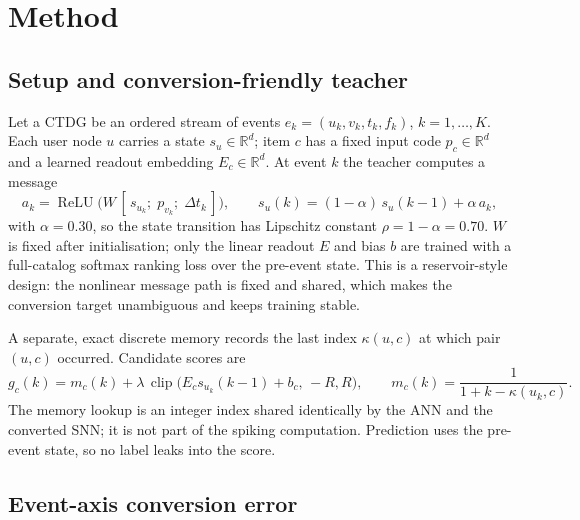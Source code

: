 \documentclass[preprint,12pt]{elsarticle}
\begin{document}
\section{Method}
\label{sec:method}

\subsection{Setup and conversion-friendly teacher}

Let a CTDG be an ordered stream of events $e_k=(u_k,v_k,t_k,f_k)$, $k=1,\dots,K$. Each user node $u$ carries a state $s_u\in\mathbb{R}^{d}$; item $c$ has a fixed input code $p_c\in\mathbb{R}^{d}$ and a learned readout embedding $E_c\in\mathbb{R}^{d}$. At event $k$ the teacher computes a message
\begin{equation}
a_k = \operatorname{ReLU}\!\big(W\,[\,s_{u_k};\;p_{v_k};\;\Delta t_k\,]\big),\qquad
s_u(k) = (1-\alpha)\,s_u(k-1) + \alpha\,a_k ,
\label{eq:message}
\end{equation}
with $\alpha=0.30$, so the state transition has Lipschitz constant $\rho=1-\alpha=0.70$. $W$ is fixed after initialisation; only the linear readout $E$ and bias $b$ are trained with a full-catalog softmax ranking loss over the pre-event state. This is a reservoir-style design: the nonlinear message path is fixed and shared, which makes the conversion target unambiguous and keeps training stable.

A separate, exact discrete memory records the last index $\kappa(u,c)$ at which pair $(u,c)$ occurred. Candidate scores are
\begin{equation}
g_c(k) = m_c(k) + \lambda\,\operatorname{clip}\big(E_c s_{u_k}(k-1) + b_c,\,-R,R\big),
\qquad m_c(k)=\frac{1}{1+k-\kappa(u_k,c)} .
\label{eq:readout}
\end{equation}
The memory lookup is an integer index shared identically by the ANN and the converted SNN; it is not part of the spiking computation. Prediction uses the pre-event state, so no label leaks into the score.

\subsection{Event-axis conversion error}
\end{document}
